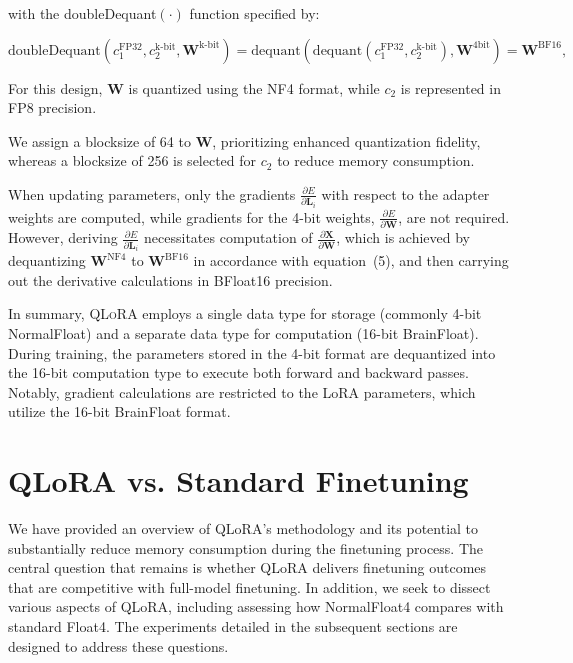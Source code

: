 with the doubleDequant$(\cdot)$ function specified by:

\begin{equation}
    \text{doubleDequant}(c_1^{\text{FP32}}, c_2^{\text{k-bit}}, \mathbf{W}^{\text{k-bit}}) = \text{dequant}(\text{dequant}(c_1^{\text{FP32}}, c_2^{\text{k-bit}}), \mathbf{W}^{\text{4bit}}) = \mathbf{W}^{\text{BF16}},
\end{equation}

For this design, $\mathbf{W}$ is quantized using the NF4 format, while $c_2$ is represented in FP8 precision.

We assign a blocksize of 64 to $\mathbf{W}$, prioritizing enhanced quantization fidelity, whereas a blocksize of 256 is selected for $c_2$ to reduce memory consumption.

When updating parameters, only the gradients $\frac{\partial E}{\partial \mathbf{L}_i}$ with respect to the adapter weights are computed, while gradients for the 4-bit weights, $\frac{\partial E}{\partial \mathbf{W}}$, are not required. However, deriving $\frac{\partial E}{\partial \mathbf{L}_i}$ necessitates computation of $\frac{\partial \mathbf{X}}{\partial \mathbf{W}}$, which is achieved by dequantizing $\mathbf{W}^{\text{NF4}}$ to $\mathbf{W}^{\text{BF16}}$ in accordance with equation~(5), and then carrying out the derivative calculations in BFloat16 precision.

In summary, \textsc{QLoRA} employs a single data type for storage (commonly 4-bit NormalFloat) and a separate data type for computation (16-bit BrainFloat). During training, the parameters stored in the 4-bit format are dequantized into the 16-bit computation type to execute both forward and backward passes. Notably, gradient calculations are restricted to the LoRA parameters, which utilize the 16-bit BrainFloat format.

\section{QLoRA vs. Standard Finetuning}
\label{sec:comp_to_std}

We have provided an overview of QLoRA’s methodology and its potential to substantially reduce memory consumption during the finetuning process. The central question that remains is whether QLoRA delivers finetuning outcomes that are competitive with full-model finetuning. In addition, we seek to dissect various aspects of QLoRA, including assessing how NormalFloat4 compares with standard Float4. The experiments detailed in the subsequent sections are designed to address these questions.

